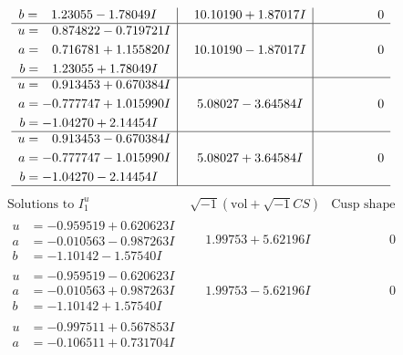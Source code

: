 \documentclass[1p]{elsarticle_modified}
\theoremstyle{definition}
\newcommand{\I}{\sqrt{-1}}
\begin{document}
$$\begin{array}{c|c|c}
\begin{aligned}
b &= \phantom{-}1.23055 - 1.78049 I\end{aligned}
 & \phantom{-}10.10190 + 1.87017 I & \phantom{-0.000000 } 0 \\ \hline\begin{aligned}
u &= \phantom{-}0.874822 - 0.719721 I \\
a &= \phantom{-}0.716781 + 1.155820 I \\
b &= \phantom{-}1.23055 + 1.78049 I\end{aligned}
 & \phantom{-}10.10190 - 1.87017 I & \phantom{-0.000000 } 0 \\ \hline\begin{aligned}
u &= \phantom{-}0.913453 + 0.670384 I \\
a &= -0.777747 + 1.015990 I \\
b &= -1.04270 + 2.14454 I\end{aligned}
 & \phantom{-}5.08027 - 3.64584 I & \phantom{-0.000000 } 0 \\ \hline\begin{aligned}
u &= \phantom{-}0.913453 - 0.670384 I \\
a &= -0.777747 - 1.015990 I \\
b &= -1.04270 - 2.14454 I\end{aligned}
 & \phantom{-}5.08027 + 3.64584 I & \phantom{-0.000000 } 0\\
 \hline 
 \end{array}$$\newpage$$\begin{array}{c|c|c}  
\text{Solutions to }I^u_{1}& \I (\text{vol} + \sqrt{-1}CS) & \text{Cusp shape}\\
 \hline 
\begin{aligned}
u &= -0.959519 + 0.620623 I \\
a &= -0.010563 - 0.987263 I \\
b &= -1.10142 - 1.57540 I\end{aligned}
 & \phantom{-}1.99753 + 5.62196 I & \phantom{-0.000000 } 0 \\ \hline\begin{aligned}
u &= -0.959519 - 0.620623 I \\
a &= -0.010563 + 0.987263 I \\
b &= -1.10142 + 1.57540 I\end{aligned}
 & \phantom{-}1.99753 - 5.62196 I & \phantom{-0.000000 } 0 \\ \hline\begin{aligned}
u &= -0.997511 + 0.567853 I \\
a &= -0.106511 + 0.731704 I \\

\end{aligned}
\end{array}$$
\end{document}
